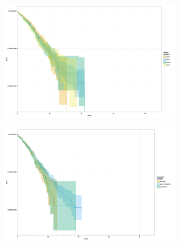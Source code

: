 \documentclass[12pt,letterpaper]{article}
\begin{document}
\begin{figure}[ht]
  \begin{center}
    \begin{subfigure}[b]{0.4\textwidth}
      \caption{}
      \includegraphics[width = \textwidth, keepaspectratio = true]{figure/km_nad}
      \label{subfig:km_nad}
    \end{subfigure}
    \begin{subfigure}[b]{0.4\textwidth}
      \caption{}
      \includegraphics[width = \textwidth, keepaspectratio = true]{figure/km_nal}
      \label{subfig:km_nal}
    \end{subfigure}


\end{center}
\end{figure}
\end{document}
